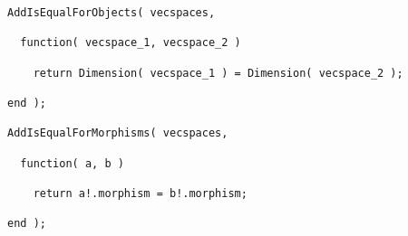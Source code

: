 \begin{small}
\begin{Verbatim}[commandchars=!@\%,frame=single]
AddIsEqualForObjects( vecspaces,
  
  function( vecspace_1, vecspace_2 )
    
    return Dimension( vecspace_1 ) = Dimension( vecspace_2 );
    
end );

AddIsEqualForMorphisms( vecspaces,

  function( a, b )
  
    return a!.morphism = b!.morphism;
  
end );
\end{Verbatim}
\end{small}
